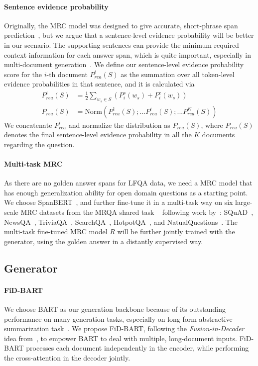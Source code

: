 \documentclass[11pt]{article}
\begin{document}
\paragraph{Sentence evidence probability}
Originally, the MRC model was designed to give accurate, short-phrase span prediction~\cite{rajpurkar2016squad}, but we argue that a sentence-level evidence probability will be better in our scenario. The supporting sentences can provide the minimum required context information for each answer span, which is quite important, especially in multi-document generation~\cite{xu2020coarse}. We define our sentence-level evidence probability score for the $i$-th document $P^i_{rea}(S)$ as the summation over all token-level evidence probabilities in that sentence, and it is calculated via
\begin{align}
    P^i_{rea}(S) &= \frac{1}{2}\sum\nolimits_{w_s\in S}(P^s_i(w_s) + P^e_i(w_s)) \\
    P_{rea}(S) &= \text{Norm}(P^1_{rea}(S); ...P^i_{rea}(S); ...P^K_{rea}(S)) 
\end{align}
We concatenate $P^i_{rea}$ and normalize the distribution as $P_{rea}(S)$, where $P_{rea}(S)$ denotes the final sentence-level evidence probability in all the $K$ documents regarding the question. 


\paragraph{Multi-task MRC}
As there are no golden answer spans for LFQA data, we need a MRC model that has enough generalization ability for open domain questions as a starting point. We choose SpanBERT~\cite{joshi2020spanbert}, and further fine-tune it in a multi-task way on six large-scale MRC datasets from the MRQA shared task ~\cite{fisch-etal-2019-mrqa} following work by~\citet{su-etal-2019-generalizing}: SQuAD~\cite{rajpurkar2016squad}, NewsQA~\cite{trischler2017newsqa}, TriviaQA~\cite{Joshi_2017}, SearchQA~\cite{dunn2017searchqa}, HotpotQA~\cite{yang2018HotpotQA}, and NatualQuestions~\cite{kwiatkowski2019natural}. The multi-task fine-tuned MRC model $R$ will be further jointly trained with the generator, using the golden answer in a distantly supervised way.

\vspace{-5pt}
\subsection{Generator}

\paragraph{FiD-BART} We choose BART as our generation backbone because of its outstanding performance on many generation tasks, especially on long-form abstractive summarization task~\cite{lewis2020bart}. We propose FiD-BART, following the \textit{Fusion-in-Decoder} idea from~\citet{izacard2021leveraging}, to empower BART to deal with multiple, long-document inputs. FiD-BART processes each document independently in the encoder, while performing the cross-attention in the decoder jointly. 
\end{document}
